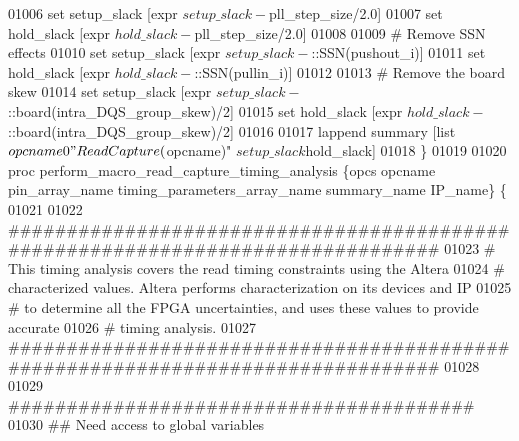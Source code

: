 \begin{DoxyCode}
01006 \textcolor{comment}{}\textcolor{comment}{   }\textcolor{keyword}{set} setup\_slack [\textcolor{keyword}{expr} $setup\_slack - $pll\_step\_size/2.0]\textcolor{comment}{}
01007 \textcolor{comment}{}   \textcolor{keyword}{set} hold\_slack  [\textcolor{keyword}{expr} $hold\_slack - $pll\_step\_size/2.0]\textcolor{comment}{}
01008 \textcolor{comment}{}
01009    \textcolor{comment}{# Remove SSN effects}
01010 \textcolor{comment}{}\textcolor{comment}{   }\textcolor{keyword}{set} setup\_slack [\textcolor{keyword}{expr} $setup\_slack - $::SSN(pushout\_i)]\textcolor{comment}{}
01011 \textcolor{comment}{}   \textcolor{keyword}{set} hold\_slack  [\textcolor{keyword}{expr} $hold\_slack  - $::SSN(pullin\_i)]\textcolor{comment}{}
01012 \textcolor{comment}{}   
01013    \textcolor{comment}{# Remove the board skew}
01014 \textcolor{comment}{}\textcolor{comment}{   }\textcolor{keyword}{set} setup\_slack [\textcolor{keyword}{expr} $setup\_slack - $::board(intra\_DQS\_group\_skew)/2]\textcolor{comment}{}
01015 \textcolor{comment}{}   \textcolor{keyword}{set} hold\_slack  [\textcolor{keyword}{expr} $hold\_slack  - $::board(intra\_DQS\_group\_skew)/2]\textcolor{comment}{}
01016 \textcolor{comment}{}
01017    \textcolor{keyword}{lappend} summary [list $opcname 0 "Read Capture ($opcname)" $setup\_slack $hold\_slack]\textcolor{comment}{}
01018 \textcolor{comment}{}\}\textcolor{comment}{}
01019 \textcolor{comment}{}
01020 \textcolor{keyword}{proc} perform\_macro\_read\_capture\_timing\_analysis \{opcs opcname pin\_array\_name
       timing\_parameters\_array\_name summary\_name IP\_name\} \{
01021 
01022    \textcolor{comment}{################################################################################}
01023 \textcolor{comment}{}\textcolor{comment}{   }\textcolor{comment}{# This timing analysis covers the read timing constraints using the Altera }
01024 \textcolor{comment}{}\textcolor{comment}{   }\textcolor{comment}{# characterized values.  Altera performs characterization on its devices and IP }
01025 \textcolor{comment}{}\textcolor{comment}{   }\textcolor{comment}{# to determine all the FPGA uncertainties, and uses these values to provide accurate }
01026 \textcolor{comment}{}\textcolor{comment}{   }\textcolor{comment}{# timing analysis.  }
01027 \textcolor{comment}{}\textcolor{comment}{   }\textcolor{comment}{################################################################################}
01028 \textcolor{comment}{}
01029    \textcolor{comment}{########################################}
01030 \textcolor{comment}{}\textcolor{comment}{   }\textcolor{comment}{## Need access to global variables}

\end{DoxyCode}

